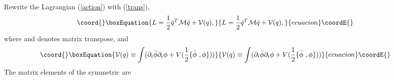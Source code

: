 \documentclass[a4paper,a4paper]{article}
\begin{document}
Rewrite the Lagrangian (\ref{action}) with (\ref{trans}),
\begin{equation}\coord{}\boxEquation{
  L=\frac 12 \dot{q}^T{\cal M}\dot{q}+{\cal V}(q),                                                      \label{CollLag}
}{
  L=\frac 12 \dot{q}^T{\cal M}\dot{q}+{\cal V}(q),                                                      }{ecuacion}\coordE{}\end{equation}
where \coordHE{} and \coordHE{} denotes 
matrix transpose, and 
\begin{equation}\coord{}\boxEquation{
  {\cal V}(q)\equiv\int(\partial_i\bar{\phi}\partial_i\phi+V(\frac 12\{\bar{\phi}\ ,\phi\}))            \label{CalPot}
}{
  {\cal V}(q)\equiv\int(\partial_i\bar{\phi}\partial_i\phi+V(\frac 12\{\bar{\phi}\ ,\phi\}))            }{ecuacion}\coordE{}\end{equation}                                                                                         
The matrix
elements of the symmetric \coordHE{} are
\end{document}
